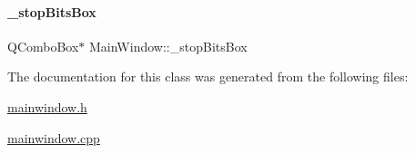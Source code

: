 \mbox{\label{classMainWindow_ad886195377aedece39671edd11ed5d39}} 
\paragraph{\texorpdfstring{\+\_\+stop\+Bits\+Box}{\_stopBitsBox}}
{\footnotesize\ttfamily Q\+Combo\+Box$\ast$ Main\+Window\+::\+\_\+stop\+Bits\+Box\hspace{0.3cm}{\ttfamily [private]}}



The documentation for this class was generated from the following files\+:\begin{DoxyCompactItemize}
\item 
\hyperlink{mainwindow_8h}{mainwindow.\+h}\item 
\hyperlink{mainwindow_8cpp}{mainwindow.\+cpp}\end{DoxyCompactItemize}
